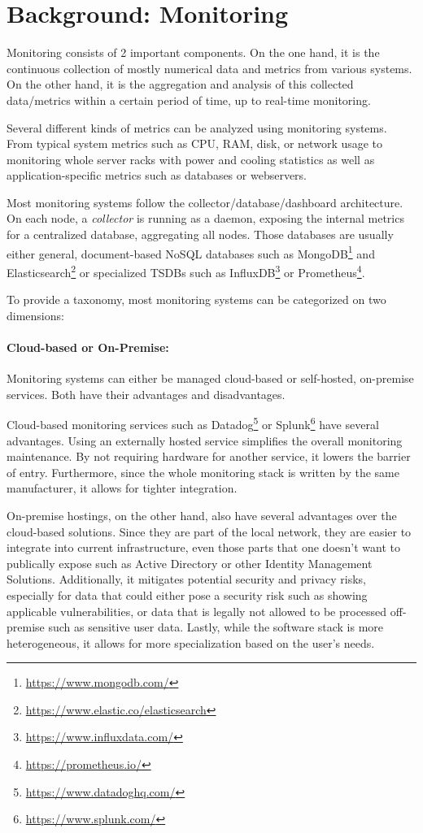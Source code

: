 \section{Background: Monitoring}
Monitoring consists of 2 important components. On the one hand, it is the continuous 
collection of mostly numerical data and metrics from various systems. On the other hand, it 
is the aggregation and analysis of this collected data/metrics within a certain period of 
time, up to real-time monitoring.

Several different kinds of metrics can be analyzed using monitoring systems. From typical
system metrics such as CPU, RAM, disk, or network usage to monitoring whole server racks
with power and cooling statistics as well as application-specific metrics such as databases
or webservers.

Most monitoring systems follow the collector/database/dashboard architecture. On each node,
a \emph{collector} is running as a daemon, exposing the internal metrics for a centralized
database, aggregating all nodes. Those databases are usually either general, document-based
NoSQL databases such as MongoDB\footnote{\url{https://www.mongodb.com/}} and 
Elasticsearch\footnote{\url{https://www.elastic.co/elasticsearch}} or specialized \acp{TSDB}
such as InfluxDB\footnote{\url{https://www.influxdata.com/}} or Prometheus\footnote{
\url{https://prometheus.io/}}.

To provide a taxonomy, most monitoring systems can be categorized on two dimensions:

\paragraph{Cloud-based or On-Premise:} Monitoring systems can either be managed cloud-based 
or self-hosted, on-premise services. Both have their advantages and disadvantages.

Cloud-based monitoring services such as Datadog\footnote{\url{https://www.datadoghq.com/}}
or Splunk\footnote{\url{https://www.splunk.com/}} have several advantages. Using an 
externally hosted service simplifies the overall monitoring maintenance. By not requiring
hardware for another service, it lowers the barrier of entry. Furthermore, since the whole
monitoring stack is written by the same manufacturer, it allows for tighter integration.

On-premise hostings, on the other hand, also have several advantages over the cloud-based 
solutions. Since they are part of the local network, they are easier to integrate into current
infrastructure, even those parts that one doesn't want to publically expose such as Active 
Directory or other Identity Management Solutions. Additionally, it mitigates potential security and privacy risks, especially for data
that could either pose a security risk such as showing applicable vulnerabilities, or data that is
legally not allowed to be processed off-premise such as sensitive user data. Lastly, while the 
software stack is more heterogeneous, it allows for more specialization based on the user's needs.

